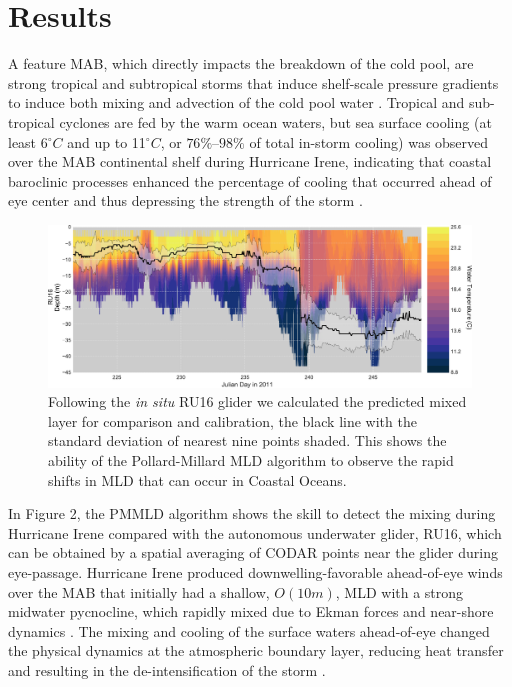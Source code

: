 \documentclass{article}
\begin{document}
\section*{Results}
A feature MAB, which directly impacts the breakdown of the cold pool, are strong tropical and subtropical storms that induce shelf-scale pressure gradients to induce both mixing and advection of the cold pool water \cite{Austin2002,Miles2013}.
Tropical and sub-tropical cyclones are fed by the warm ocean waters, but sea surface cooling (at least 6$^{\circ}C$ and up to 11$^{\circ}C$, or $76\%$–$98\%$ of total in-storm cooling) was observed over the MAB continental shelf during Hurricane Irene, indicating that coastal baroclinic processes enhanced the percentage of cooling that occurred ahead of eye center and thus depressing the strength of the storm \cite{Seroka2016,Glenn2016}. 
\begin{figure}[h]
\caption{Following the \textit{in situ} RU16 glider we calculated the predicted mixed layer for comparison and calibration, the black line with the standard deviation of nearest nine points shaded. This shows the ability of the Pollard-Millard MLD algorithm to observe the rapid shifts in MLD that can occur in Coastal Oceans.}
\centering
\includegraphics[width=1.0\textwidth,keepaspectratio]{CodarVglider_Irene.pdf}
\end{figure}
In Figure 2, the PMMLD algorithm shows the skill to detect the mixing during Hurricane Irene compared with the autonomous underwater glider, RU16, which can be obtained by a spatial averaging of CODAR points near the glider during eye-passage. 
Hurricane Irene produced downwelling-favorable ahead-of-eye winds over the MAB that initially had a shallow, $O(10m)$, MLD with a strong midwater pycnocline, which rapidly mixed due to Ekman forces and near-shore dynamics \cite{Austin2002}.
The mixing and cooling of the surface waters ahead-of-eye changed the physical dynamics at the atmospheric boundary layer, reducing heat transfer and resulting in the de-intensification of the storm \cite{Seroka2016}. 
\end{document}
